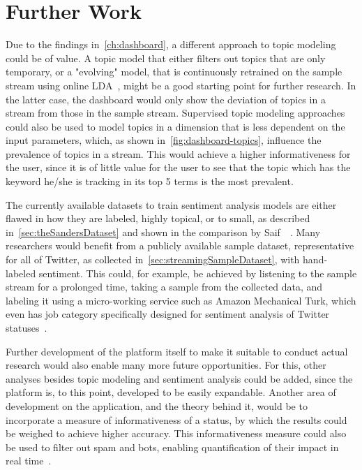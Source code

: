 \chapter{Further Work}
\label{ch:furtherWork}

Due to the findings in~\ref{ch:dashboard}, %
a different approach to topic modeling could be of value.
A topic model that either filters out topics that are only temporary,
or a "evolving" model, that is continuously retrained on the sample stream using online LDA~\cite{hoffman2010online},
might be a good starting point for further research.
In the latter case, the dashboard would only show the deviation of topics in a stream from those in the sample stream.
Supervised topic modeling approaches could also be used to model topics in a dimension that is less dependent on the input parameters,
which, as shown in~\ref{fig:dashboard-topics}, influence the prevalence of topics in a stream.
This would achieve a higher informativeness for the user, since it is of little value for the user to
see that the topic which has the keyword he/she is tracking in its top 5 terms is the most prevalent.
\par
The currently available datasets to train sentiment analysis models are either flawed in how they are labeled, highly topical,
or to small, as described in~\ref{sec:theSandersDataset} and shown in the comparison by Saif~\etAl~\cite{Saif2013}.
Many researchers would benefit from a publicly available sample dataset, representative for all of Twitter,
as collected in~\ref{sec:streamingSampleDataset}, with hand-labeled sentiment.
This could, for example, be achieved by listening to the sample stream for a prolonged time,
taking a sample from the collected data, and labeling it using a micro-working service such as Amazon Mechanical Turk,
which even has job category specifically designed for sentiment analysis of Twitter statuses~\cite{mturk}.
\par
Further development of the platform itself to make it suitable to conduct actual research
would also enable many more future opportunities.
For this, other analyses besides topic modeling and sentiment analysis could be added,
since the platform is, to this point, developed to be easily expandable.
Another area of development on the application, and the theory behind it,
would be to incorporate a measure of informativeness of a status,
by which the results could be weighed to achieve higher accuracy.
This informativeness measure could also be used to filter out spam and bots,
enabling quantification of their impact in real time~\cite{haustein2016tweets}.